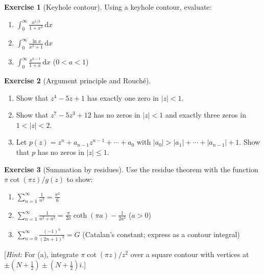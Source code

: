 \documentclass[12pt,a4paper,openany]{book}
\theoremstyle{definition}
\newtheorem{exercise}{Exercise}[chapter]
\theoremstyle{plain}
\theoremstyle{remark}
\newcommand{\dd}{\mathrm{d}}
\newcommand{\abs}[1]{\left|#1\right|}
\begin{document}
\begin{exercise}[Keyhole contour]\label{exer:keyhole}
Using a keyhole contour, evaluate:
\begin{enumerate}[label=(\alph*)]
  \item $\displaystyle\int_0^{\infty}\frac{x^{1/3}}{1+x^2}\,\dd x$
  \item $\displaystyle\int_0^{\infty}\frac{\ln x}{x^2+1}\,\dd x$
  \item $\displaystyle\int_0^{\infty}\frac{x^{a-1}}{1+x}\,\dd x$
        \quad ($0<a<1$) \quad
        [\emph{Euler's reflection formula:
        $\Gamma(a)\Gamma(1-a)=\pi/\sin(\pi a)$}]
\end{enumerate}
\end{exercise}

\begin{exercise}[Argument principle and Rouch\'e]\label{exer:rouche}
\begin{enumerate}[label=(\alph*)]
  \item Show that $z^4-5z+1$ has exactly one zero in $\abs{z}<1$.
  \item Show that $z^7-5z^3+12$ has no zeros in $\abs{z}<1$ and
        exactly three zeros in $1<\abs{z}<2$.
  \item Let $p(z)=z^n+a_{n-1}z^{n-1}+\cdots+a_0$ with
        $\abs{a_0}>\abs{a_1}+\cdots+\abs{a_{n-1}}+1$.  Show that $p$
        has no zeros in $\abs{z}\leq 1$.
\end{enumerate}
\end{exercise}

\begin{exercise}[Summation by residues]\label{exer:summation}
Use the residue theorem with the function $\pi\cot(\pi z)/g(z)$ to show:
\begin{enumerate}[label=(\alph*)]
  \item $\displaystyle\sum_{n=1}^{\infty}\frac{1}{n^2}=\frac{\pi^2}{6}$
  \item $\displaystyle\sum_{n=1}^{\infty}\frac{1}{n^2+a^2}
        =\frac{\pi}{2a}\coth(\pi a)-\frac{1}{2a^2}$ \quad ($a>0$)
  \item $\displaystyle\sum_{n=0}^{\infty}\frac{(-1)^n}{(2n+1)^2}
        =G$ \quad (Catalan's constant; express as a contour integral)
\end{enumerate}
[\emph{Hint:} For (a), integrate $\pi\cot(\pi z)/z^2$ over a square
contour with vertices at $\pm(N+\tfrac{1}{2})\pm(N+\tfrac{1}{2})i$.]
\end{exercise}
\end{document}
